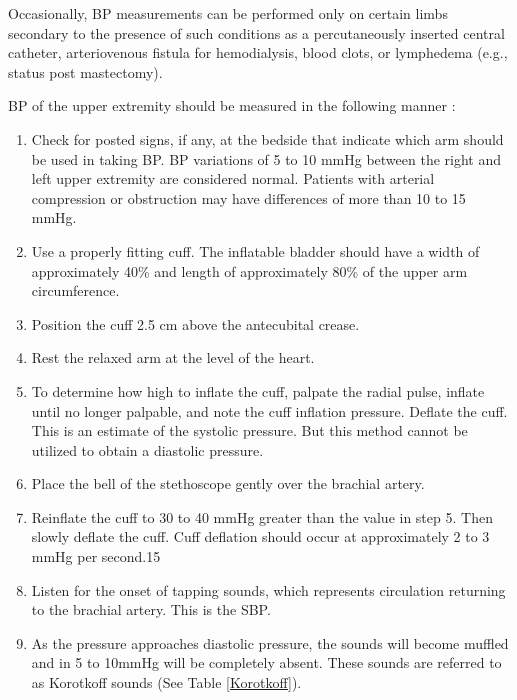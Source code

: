 Occasionally, BP measurements can be performed only on certain limbs secondary to the presence of such conditions as a percutaneously inserted central catheter, arteriovenous fistula for hemodialysis, blood clots, or lymphedema (e.g., status post mastectomy). 

BP of the upper extremity should be measured in the following manner \cite{collins_cardiac_2019}:

\begin{enumerate}
\item Check for posted signs, if any, at the bedside that indicate which arm should be used in taking BP. BP variations of 5 to 10 mmHg between the right and left upper extremity are considered normal. Patients with arterial compression or obstruction may have differences of more than 10 to 15 mmHg.
\item Use a properly fitting cuff. The inflatable bladder should have a width of approximately 40\% and length of approximately 80\% of the upper arm circumference.
\item Position the cuff 2.5 cm above the antecubital crease.
\item Rest the relaxed arm at the level of the heart.
\item To determine how high to inflate the cuff, palpate the radial pulse, inflate until no longer palpable, and note the cuff inflation pressure. Deflate the cuff. This is an estimate of the systolic pressure. But this method cannot be utilized to obtain a diastolic pressure.
\item Place the bell of the stethoscope gently over the brachial artery.
\item Reinflate the cuff to 30 to 40 mmHg greater than the value in step 5. Then slowly deflate the cuff. Cuff deflation should occur at approximately 2 to 3 mmHg per second.15
\item Listen for the onset of tapping sounds, which represents circulation returning to the brachial artery. This is the SBP.
\item As the pressure approaches diastolic pressure, the sounds will become muffled and in 5 to 10mmHg will be completely absent. These sounds are referred to as Korotkoff sounds (See Table \ref{Korotkoff}).
\end{enumerate}


